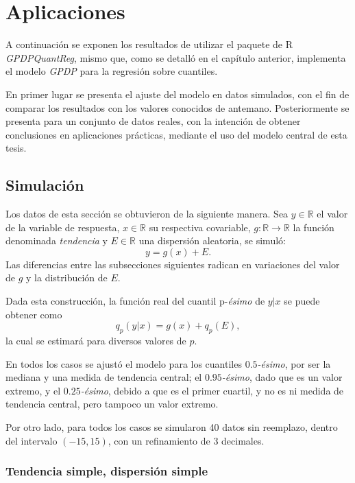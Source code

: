 \chapter[Aplicaciones]{Aplicaciones}

A continuaci\'on se exponen los resultados de utilizar el paquete de R \textit{GPDPQuantReg}, mismo que, como se detalló en el cap\'itulo anterior, implementa el modelo \textit{GPDP} para la regresi\'on sobre cuantiles.

En primer lugar se presenta el ajuste del modelo en datos simulados, con el fin de comparar los resultados con los valores conocidos de antemano. Posteriormente se presenta para un conjunto de datos reales, con la intenci\'on de obtener conclusiones en aplicaciones pr\'acticas, mediante el uso del modelo central de esta tesis.

\section{Simulaci\'on}

Los datos de esta secci\'on se obtuvieron de la siguiente manera. Sea $y \in \mathbb{R}$ el valor de la variable de respuesta, $x \in \mathbb{R}$ su respectiva covariable, $g: \mathbb{R} \rightarrow \mathbb{R}$ la funci\'on denominada \textit{tendencia} y $E \in \mathbb{R}$ una dispersi\'on aleatoria, se simul\'o:
\begin{equation*}
    y = g(x) + E.
\end{equation*}
Las diferencias entre las subsecciones siguientes radican en variaciones del valor de $g$ y la distribuci\'on de $E$.

Dada esta construcci\'on, la funci\'on real del cuantil p-\textit{\'esimo} de $y|x$ se puede obtener como
\begin{equation*}
    q_p(y|x) = g(x) + q_p(E),
\end{equation*}
la cual se estimar\'a para diversos valores de $p$.

En todos los casos se ajust\'o el modelo para los cuantiles $0.5$\textit{-\'esimo}, por ser la mediana y una medida de tendencia central; el $0.95$\textit{-\'esimo}, dado que es un valor extremo, y el $0.25$\textit{-\'esimo}, debido a que es el primer cuartil, y no es ni medida de tendencia central, pero tampoco un valor extremo.

Por otro lado, para todos los casos se simularon 40 datos sin reemplazo, dentro del intervalo $(-15,15)$, con un refinamiento de 3 decimales.

\subsection{Tendencia simple, dispersi\'on simple}

